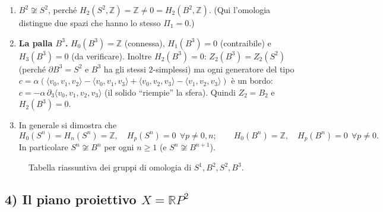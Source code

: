 \begin{observacion}
\begin{enumerate}
    \item $B^2 \not\cong S^2$, perch\'e $H_2(S^2, \mathbb{Z}) = \mathbb{Z} \neq 0 = H_2(B^2, \mathbb{Z})$. (Qui l'omologia distingue due spazi che hanno lo stesso $\Pi_1 = 0$.)
    \item \textbf{La palla $B^3$.} $H_0(B^3) = \mathbb{Z}$ (connessa), $H_1(B^3) = 0$ (contraibile) e $H_3(B^3) = 0$ (da verificare). Inoltre $H_2(B^3) = 0$: $Z_2(B^3) = Z_2(S^2)$ (perch\'e $\partial B^3 = S^2$ e $B^3$ ha gli stessi $2$-simplessi) ma ogni generatore del tipo $c = \alpha(\langle v_0, v_1, v_2 \rangle - \langle v_0, v_1, v_3 \rangle + \langle v_0, v_2, v_3 \rangle - \langle v_1, v_2, v_3 \rangle)$ \`e un bordo: $c = -\alpha\, \partial_3 \langle v_0, v_1, v_2, v_3 \rangle$ (il solido ``riempie'' la sfera). Quindi $Z_2 = B_2$ e $H_2(B^3) = 0$.
    \item In generale si dimostra che
    \[
    H_0(S^n) = H_n(S^n) = \mathbb{Z}, \quad H_p(S^n) = 0 \ \ \forall p \neq 0, n; \qquad H_0(B^n) = \mathbb{Z}, \quad H_p(B^n) = 0 \ \ \forall p \neq 0.
    \]
    In particolare $S^n \not\cong B^n$ per ogni $n \geqslant 1$ (e $S^n \not\cong B^{n+1}$).
\end{enumerate}
\end{observacion}

\begin{figure}[H]
    \centering
    \caption{Tabella riassuntiva dei gruppi di omologia di $S^1, B^2, S^2, B^3$.}
\end{figure}


\subsection{4) Il piano proiettivo $X = \mathbb{R}P^2$}

